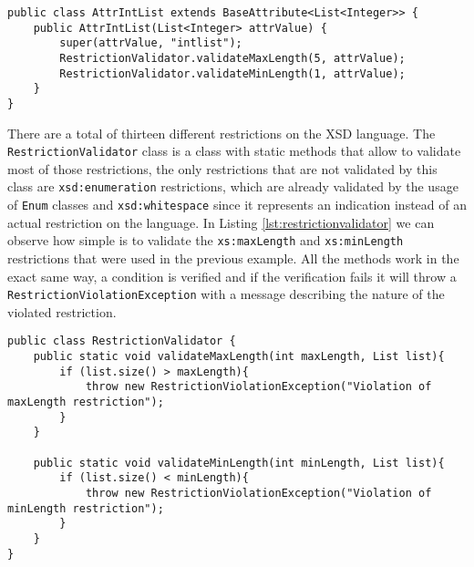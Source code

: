 \bigskip


\begin{minipage}{\linewidth}
\begin{lstlisting}[caption={Attribute Constructor Enforcing Restrictions},captionpos=b,label={lst:attrhardcodedrestrictions}]
public class AttrIntList extends BaseAttribute<List<Integer>> {
    public AttrIntList(List<Integer> attrValue) {
        super(attrValue, "intlist");
        RestrictionValidator.validateMaxLength(5, attrValue);
        RestrictionValidator.validateMinLength(1, attrValue);
    }
}

\end{lstlisting}
\end{minipage}

\noindent
There are a total of thirteen different restrictions on the \ac{XSD} language. The \texttt{RestrictionValidator} class is a class with static methods that allow to validate most of those restrictions, the only restrictions that are not validated by this class are \texttt{xsd:enumeration} restrictions, which are already validated by the usage of \texttt{Enum} classes and \texttt{xsd:whitespace} since it represents an indication instead of an actual restriction on the language. In Listing \ref{lst:restrictionvalidator} we can observe how simple is to validate the \texttt{xs:maxLength} and \texttt{xs:minLength} restrictions that were used in the previous example. All the methods work in the exact same way, a condition is verified and if the verification fails it will throw a \texttt{RestrictionViolationException} with a message describing the nature of the violated restriction.

\bigskip


\begin{minipage}{\linewidth}
\begin{lstlisting}[caption={RestrictionValidator Class - The Validation Methods},label={lst:restrictionvalidator}]
public class RestrictionValidator {
    public static void validateMaxLength(int maxLength, List list){
        if (list.size() > maxLength){
            throw new RestrictionViolationException("Violation of maxLength restriction");
        }
    }
    
    public static void validateMinLength(int minLength, List list){
        if (list.size() < minLength){
            throw new RestrictionViolationException("Violation of minLength restriction");
        }
    }
}
\end{lstlisting}
\end{minipage}

